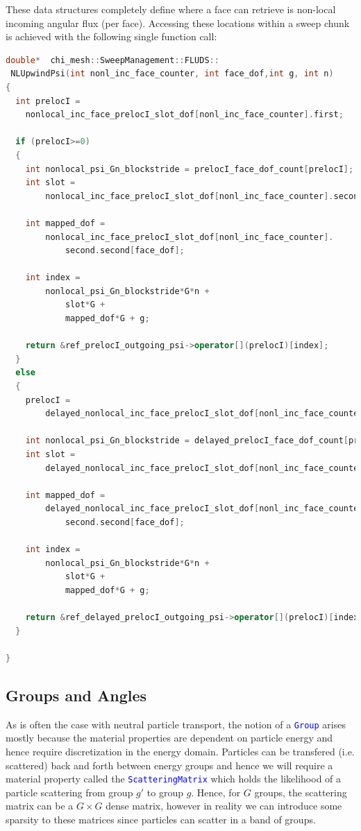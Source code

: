 \documentclass[11pt,letterpaper,titlepage]{article}
\newcommand{\xmltag}[1]{\textcolor{blue}{ \texttt{#1}} }
\newcommand{\stimes}{{\times}}
\numberwithin{equation}{section}
\begin{document}
These data structures completely define where a face can retrieve is non-local incoming angular flux (per face). Accessing these locations within a sweep chunk is achieved with the following single function call:

\begin{lstlisting}[language=c++]
double*  chi_mesh::SweepManagement::FLUDS::
 NLUpwindPsi(int nonl_inc_face_counter, int face_dof,int g, int n)
{
  int prelocI =
    nonlocal_inc_face_prelocI_slot_dof[nonl_inc_face_counter].first;

  if (prelocI>=0)
  {
    int nonlocal_psi_Gn_blockstride = prelocI_face_dof_count[prelocI];
    int slot =
        nonlocal_inc_face_prelocI_slot_dof[nonl_inc_face_counter].second.first;

    int mapped_dof =
        nonlocal_inc_face_prelocI_slot_dof[nonl_inc_face_counter].
            second.second[face_dof];

    int index =
        nonlocal_psi_Gn_blockstride*G*n +
            slot*G +
            mapped_dof*G + g;

    return &ref_prelocI_outgoing_psi->operator[](prelocI)[index];
  }
  else
  {
    prelocI =
        delayed_nonlocal_inc_face_prelocI_slot_dof[nonl_inc_face_counter].first;

    int nonlocal_psi_Gn_blockstride = delayed_prelocI_face_dof_count[prelocI];
    int slot =
        delayed_nonlocal_inc_face_prelocI_slot_dof[nonl_inc_face_counter].second.first;

    int mapped_dof =
        delayed_nonlocal_inc_face_prelocI_slot_dof[nonl_inc_face_counter].
            second.second[face_dof];

    int index =
        nonlocal_psi_Gn_blockstride*G*n +
            slot*G +
            mapped_dof*G + g;

    return &ref_delayed_prelocI_outgoing_psi->operator[](prelocI)[index];
  }

}
\end{lstlisting}



\subsection{Groups and Angles}
As is often the case with neutral particle transport, the notion of a \xmltag{Group} arises mostly because the material properties are dependent on particle energy and hence require discretization in the energy domain. Particles can be transfered (i.e. scattered) back and forth between energy groups and hence we will require a material property called the \xmltag{ScatteringMatrix} which holds the likelihood of a particle scattering from group $g'$ to group $g$. Hence, for $G$ groups, the scattering matrix can be a $G\stimes G$ dense matrix, however in reality we can introduce some sparsity to these matrices since particles can scatter in a band of groups.\newline 
\end{document}
